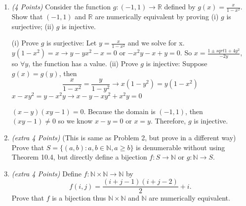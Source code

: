 \documentclass[10pt]{article} %
\newcommand{\ds}{\displaystyle}
\newcommand{\cS}{\mathcal{S}}
\newcommand{\N}{\mathbb{N}}
\newcommand{\R}{\mathbb{R}}
\newcommand{\points}[1]{{\it (#1 Points)}}
\begin{document}
\begin{enumerate}
  \item\points{4} Consider the function $g:(-1,1)\to \R$ defined by $g(x)=\ds \frac{x}{1-x^2}$. Show that $(-1,1)$ and $\R$ are numerically equivalent by proving (i)  $g$ is surjective; (ii) $g$ is injective.
  
  (i) Prove $g$ is surjective:
  Let $y=\frac{x}{1-x^2}$ and we solve for x.  
  $y(1-x^2)=x \rightarrow y-yx^2-x=0$ or $-x^2y-x+y=0$.  So $x=\frac{1\pm sqrt{1+4y^2}}{-2y}$, so $\forall y$, the function has a value.  
  (ii) Prove $g$ is injective:
  Suppose $g(x)=g(y)$, then $$\frac{x}{1-x^2}=\frac{y}{1-y^2} \rightarrow x(1-y^2)=y(1-x^2)$$
  $x-xy^2=y-x^2y \rightarrow x-y-xy^2+x^2y=0$
  
  $(x-y)(xy-1)=0$.  Because the domain is $(-1,1)$, then $(xy-1)\neq 0$ so we know $x-y=0$ or $x=y$.  Therefore, $g$ is injective.  


      \item\points{extra 4} (This is same as Problem 2, but prove in a different way) Prove that $S=\{(a, b):  a, b\in \N, a\ge b\}$ is denumerable without using Theorem 10.4, but directly define a bijection $f:S\to \N$ or $g:\N\to S$.

      \item\points{extra 4} Define $f:\N\times \N\to \N$ by
      $$f(i,j)=\frac{(i+j-1)(i+j-2)}{2}+i.$$
      Prove that $f$ is a bijection thus $\N\times \N$ and $\N$ are numerically equivalent.






\end{enumerate}
\end{document}
